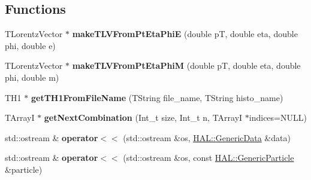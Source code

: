 \subsection*{Functions}
\begin{DoxyCompactItemize}
\item 
\hypertarget{namespace_h_a_l_aff015dfdeff19d0696ae1b3d6fecf49a}{T\+Lorentz\+Vector $\ast$ {\bfseries make\+T\+L\+V\+From\+Pt\+Eta\+Phi\+E} (double p\+T, double eta, double phi, double e)}\label{namespace_h_a_l_aff015dfdeff19d0696ae1b3d6fecf49a}

\item 
\hypertarget{namespace_h_a_l_a8b1948d67b09632a981e5c39eebb4470}{T\+Lorentz\+Vector $\ast$ {\bfseries make\+T\+L\+V\+From\+Pt\+Eta\+Phi\+M} (double p\+T, double eta, double phi, double m)}\label{namespace_h_a_l_a8b1948d67b09632a981e5c39eebb4470}

\item 
\hypertarget{namespace_h_a_l_abb1838fcb707a37ea7541d0dde9d9032}{T\+H1 $\ast$ {\bfseries get\+T\+H1\+From\+File\+Name} (T\+String file\+\_\+name, T\+String histo\+\_\+name)}\label{namespace_h_a_l_abb1838fcb707a37ea7541d0dde9d9032}

\item 
\hypertarget{namespace_h_a_l_a7f4c7ad70074df44a822af96ea4e1b1c}{T\+Array\+I $\ast$ {\bfseries get\+Next\+Combination} (Int\+\_\+t size, Int\+\_\+t n, T\+Array\+I $\ast$indices=N\+U\+L\+L)}\label{namespace_h_a_l_a7f4c7ad70074df44a822af96ea4e1b1c}

\item 
\hypertarget{namespace_h_a_l_a659c783b14f06a4ada3e27926587270c}{std\+::ostream \& {\bfseries operator$<$$<$} (std\+::ostream \&os, \hyperlink{class_h_a_l_1_1_generic_data}{H\+A\+L\+::\+Generic\+Data} \&data)}\label{namespace_h_a_l_a659c783b14f06a4ada3e27926587270c}

\item 
\hypertarget{namespace_h_a_l_a54ec71617e0c3cb17f5060d8481d61bc}{std\+::ostream \& {\bfseries operator$<$$<$} (std\+::ostream \&os, const \hyperlink{class_h_a_l_1_1_generic_particle}{H\+A\+L\+::\+Generic\+Particle} \&particle)}\label{namespace_h_a_l_a54ec71617e0c3cb17f5060d8481d61bc}


\end{DoxyCompactItemize}
